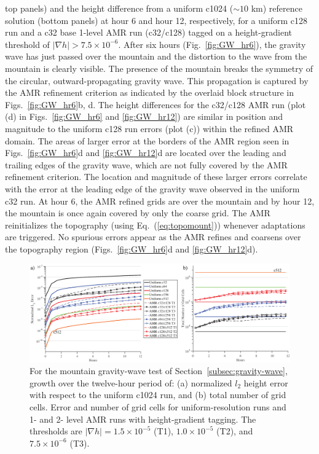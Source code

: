 top panels) and the height difference from a uniform c1024 ($\sim 10$ km) reference
solution (bottom panels) at hour 6 and hour 12, respectively, for a
uniform c128 run and a c32 base 1-level AMR run (c32/c128) tagged on a
height-gradient threshold of $|\nabla h| > 7.5 \times 10^{-6}$.  After
six hours (Fig.~\ref{fig:GW_hr6}), the gravity wave has just passed over the mountain
and the distortion to the wave from the mountain is clearly visible.
The presence of the mountain breaks the symmetry of the circular,
outward-propagating gravity wave.  This propagation is captured by the
AMR refinement criterion as indicated by the overlaid block structure in
Figs.~\ref{fig:GW_hr6}b, d.  The height differences for the c32/c128 AMR run (plot
(d) in 
Figs.~\ref{fig:GW_hr6} and
\ref{fig:GW_hr12}) are similar in position and magnitude to the uniform
c128 run errors (plot (c)) within the refined AMR domain.  The areas of
larger error at the borders of the AMR region seen in 
Figs.~\ref{fig:GW_hr6}d and
\ref{fig:GW_hr12}d are located over the leading and trailing edges of
the gravity wave, which are not fully covered by the AMR refinement criterion.  The
location and magnitude of these larger errors correlate with the error
at the leading edge of the gravity wave observed in the uniform c32
run.  At hour 6, the AMR refined grids are over the mountain and by hour
12, the mountain is once again covered by only the coarse grid.  The AMR
reinitializes the topography (using Eq.~(\ref{eq:topomount})) whenever adaptations are triggered.  No spurious
errors appear as the AMR refines and coarsens over the topography region
(Figs.~\ref{fig:GW_hr6}d and \ref{fig:GW_hr12}d).
%
\begin{figure}
    \centerline{%
    \noindent
    \includegraphics[width=\textwidth]{Chap1/final_gw_l2andgrid_plots.eps}}
    \caption{
For the mountain gravity-wave test of
Section~\ref{subsec:gravity-wave},
growth over the twelve-hour period of:
(a) normalized $l_2$ height error with
    respect to the uniform c1024 run, and (b) total number of grid cells.
    Error and number of grid cells for uniform-resolution runs and 1- and 2- level
    AMR runs with height-gradient tagging. The thresholds are
    $|\nabla h| =1.5\times 10^{-5}$ (T1), $1.0\times 10^{-5}$ (T2), 
    and $7.5 \times 10^{-6}$ (T3).}%
    \label{fig:GW_l2err}
\end{figure}

